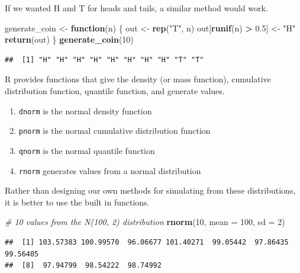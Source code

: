 \documentclass[]{article}
\newenvironment{Shaded}{\begin{snugshade}}{\end{snugshade}}
\newcommand{\KeywordTok}[1]{\textcolor[rgb]{0.13,0.29,0.53}{\textbf{#1}}}
\newcommand{\DataTypeTok}[1]{\textcolor[rgb]{0.13,0.29,0.53}{#1}}
\newcommand{\DecValTok}[1]{\textcolor[rgb]{0.00,0.00,0.81}{#1}}
\newcommand{\FloatTok}[1]{\textcolor[rgb]{0.00,0.00,0.81}{#1}}
\newcommand{\StringTok}[1]{\textcolor[rgb]{0.31,0.60,0.02}{#1}}
\newcommand{\CommentTok}[1]{\textcolor[rgb]{0.56,0.35,0.01}{\textit{#1}}}
\newcommand{\ControlFlowTok}[1]{\textcolor[rgb]{0.13,0.29,0.53}{\textbf{#1}}}
\newcommand{\OperatorTok}[1]{\textcolor[rgb]{0.81,0.36,0.00}{\textbf{#1}}}
\newcommand{\NormalTok}[1]{#1}
\providecommand{\tightlist}{%
  \setlength{\itemsep}{0pt}\setlength{\parskip}{0pt}}
\begin{document}
If we wanted H and T for heads and tails, a similar method would work.

\begin{Shaded}
\begin{Highlighting}[]
\NormalTok{generate_coin <-}\StringTok{ }\ControlFlowTok{function}\NormalTok{(n) \{}
\NormalTok{    out <-}\StringTok{ }\KeywordTok{rep}\NormalTok{(}\StringTok{"T"}\NormalTok{, n)}
\NormalTok{    out[}\KeywordTok{runif}\NormalTok{(n) }\OperatorTok{>}\StringTok{ }\FloatTok{0.5}\NormalTok{] <-}\StringTok{ "H"}
    \KeywordTok{return}\NormalTok{(out)}
\NormalTok{\}}
\KeywordTok{generate_coin}\NormalTok{(}\DecValTok{10}\NormalTok{)}
\end{Highlighting}
\end{Shaded}

\begin{verbatim}
##  [1] "H" "H" "H" "H" "H" "H" "H" "H" "T" "T"
\end{verbatim}

R provides functions that give the density (or mass function),
cumulative distribution function, quantile function, and generate
values.

\begin{enumerate}
\def\labelenumi{\arabic{enumi}.}
\tightlist
\item
  \texttt{dnorm} is the normal density function
\item
  \texttt{pnorm} is the normal cumulative distribution function
\item
  \texttt{qnorm} is the normal quantile function
\item
  \texttt{rnorm} generates values from a normal distribution
\end{enumerate}

Rather than designing our own methods for simulating from these
distributions, it is better to use the built in functions.

\begin{Shaded}
\begin{Highlighting}[]
\CommentTok{# 10 values from the N(100, 2) distribution}
\KeywordTok{rnorm}\NormalTok{(}\DecValTok{10}\NormalTok{, }\DataTypeTok{mean =} \DecValTok{100}\NormalTok{, }\DataTypeTok{sd =} \DecValTok{2}\NormalTok{)}
\end{Highlighting}
\end{Shaded}

\begin{verbatim}
##  [1] 103.57383 100.99570  96.06677 101.40271  99.05442  97.86435  99.56405
##  [8]  97.94799  98.54222  98.74992
\end{verbatim}
\end{document}
